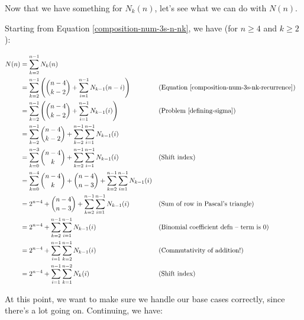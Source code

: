 Now that we have something for $N_k(n)$, let's see what we can do with $N(n)$. 

Starting from Equation \ref{composition-num-3s-n-nk}, we have (for $n \geq 4$ and $k \geq 2$):

\begin{align*}
N(n) &= \sum_{k=2}^{n-1} N_k(n) \\
&= \sum_{k=2}^{n-1} \left( \binom{n-4}{k-2} + \sum_{i=1}^{n-1} N_{k-1}(n-i) \right) && \text{(Equation \ref{composition-num-3s-nk-recurrence})} \\
&= \sum_{k=2}^{n-1} \left( \binom{n-4}{k-2} + \sum_{i=1}^{n-1} N_{k-1}(i) \right) && \text{(Problem \ref{defining-sigma})} \\
&= \sum_{k=2}^{n-1} \binom{n-4}{k-2} + \sum_{k=2}^{n-1} \sum_{i=1}^{n-1} N_{k-1}(i) \\
&= \sum_{k=0}^{n-3} \binom{n-4}{k} + \sum_{k=2}^{n-1} \sum_{i=1}^{n-1} N_{k-1}(i) && \text{(Shift index)} \\
&= \sum_{k=0}^{n-4} \binom{n-4}{k} + \binom{n-4}{n-3} + \sum_{k=2}^{n-1} \sum_{i=1}^{n-1} N_{k-1}(i) \\
&= 2^{n-4} + \binom{n-4}{n-3} + \sum_{k=2}^{n-1} \sum_{i=1}^{n-1} N_{k-1}(i) && \text{(Sum of row in Pascal's triangle)} \\
&= 2^{n-4} + \sum_{k=2}^{n-1} \sum_{i=1}^{n-1} N_{k-1}(i) && \text{(Binomial coefficient defn -- term is 0)} \\
&= 2^{n-4} + \sum_{i=1}^{n-1} \sum_{k=2}^{n-1} N_{k-1}(i) && \text{(Commutativity of addition!)} \\
&= 2^{n-4} + \sum_{i=1}^{n-1} \sum_{k=1}^{n-2} N_{k}(i) && \text{(Shift index)}
\end{align*}


At this point, we want to make sure we handle our base cases correctly, since there's a lot going on. Continuing, we have:


